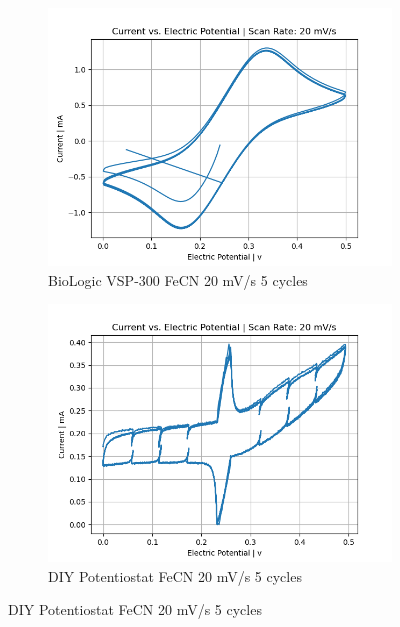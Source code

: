 \documentclass{article}
\begin{document}
\begin{figure}[H]
\centering
\begin{subfigure}[b]{0.45\textwidth}
\includegraphics[width=\textwidth]{FECN_20mVs_5cycles_lab.png}
\caption{BioLogic VSP-300 FeCN 20 mV/s 5 cycles}
\end{subfigure}
\hfill
\begin{subfigure}[b]{0.45\textwidth}
\includegraphics[width=\textwidth]{FECN_20mVs_5cycles.png}
\caption{DIY Potentiostat FeCN 20 mV/s 5 cycles}
\end{subfigure}


\end{figure}
\end{document}
